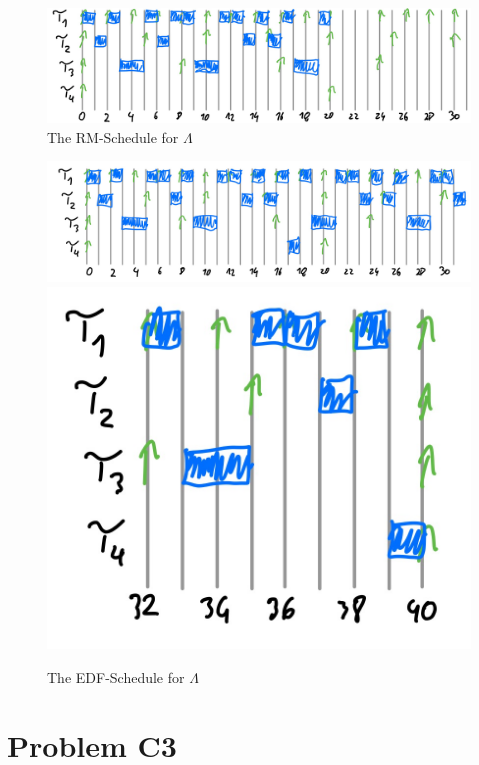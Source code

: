 \documentclass[12pt]{article}
\begin{document}
\begin{itemize}
		\begin{figure}[h]
		\centering
		\includegraphics[scale = 0.2]{figures/c2_3}
		\caption{The RM-Schedule for $\Lambda$}
		\end{figure}

		\begin{figure}[h]
		\centering
		\includegraphics[scale = 0.15]{figures/c2_4}
		\includegraphics[scale = 0.15]{figures/c2_5}
		\caption{The EDF-Schedule for $\Lambda$}
		\end{figure}

\end{itemize}


\section*{Problem C3}
\end{document}
